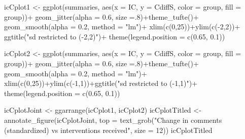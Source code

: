 \documentclass[
  10pt,
  dvipsnames,enabledeprecatedfontcommands]{scrartcl}
\newenvironment{Shaded}{\begin{snugshade}}{\end{snugshade}}
\newcommand{\AttributeTok}[1]{\textcolor[rgb]{0.77,0.63,0.00}{#1}}
\newcommand{\DecValTok}[1]{\textcolor[rgb]{0.00,0.00,0.81}{#1}}
\newcommand{\FloatTok}[1]{\textcolor[rgb]{0.00,0.00,0.81}{#1}}
\newcommand{\FunctionTok}[1]{\textcolor[rgb]{0.00,0.00,0.00}{#1}}
\newcommand{\NormalTok}[1]{#1}
\newcommand{\OtherTok}[1]{\textcolor[rgb]{0.56,0.35,0.01}{#1}}
\newcommand{\SpecialCharTok}[1]{\textcolor[rgb]{0.00,0.00,0.00}{#1}}
\newcommand{\StringTok}[1]{\textcolor[rgb]{0.31,0.60,0.02}{#1}}
\begin{document}
\begin{Shaded}
\begin{Highlighting}[]
\NormalTok{icCplot1 }\OtherTok{\textless{}{-}} \FunctionTok{ggplot}\NormalTok{(summaries, }\FunctionTok{aes}\NormalTok{(}\AttributeTok{x =}\NormalTok{ IC, }\AttributeTok{y =}\NormalTok{ CdiffS, }\AttributeTok{color =}\NormalTok{ group, }\AttributeTok{fill =}\NormalTok{ group))}\SpecialCharTok{+}
  \FunctionTok{geom\_jitter}\NormalTok{(}\AttributeTok{alpha =} \FloatTok{0.6}\NormalTok{, }\AttributeTok{size =}\NormalTok{.}\DecValTok{8}\NormalTok{)}\SpecialCharTok{+}\FunctionTok{theme\_tufte}\NormalTok{()}\SpecialCharTok{+}
  \FunctionTok{geom\_smooth}\NormalTok{(}\AttributeTok{alpha =} \FloatTok{0.2}\NormalTok{, }\AttributeTok{method =} \StringTok{"lm"}\NormalTok{)}\SpecialCharTok{+}
  \FunctionTok{xlim}\NormalTok{(}\FunctionTok{c}\NormalTok{(}\DecValTok{0}\NormalTok{,}\DecValTok{25}\NormalTok{))}\SpecialCharTok{+}\FunctionTok{ylim}\NormalTok{(}\FunctionTok{c}\NormalTok{(}\SpecialCharTok{{-}}\DecValTok{2}\NormalTok{,}\DecValTok{2}\NormalTok{))}\SpecialCharTok{+}
  \FunctionTok{ggtitle}\NormalTok{(}\StringTok{"sd restricted to ({-}2,2)"}\NormalTok{)}\SpecialCharTok{+}
  \FunctionTok{theme}\NormalTok{(}\AttributeTok{legend.position =} \FunctionTok{c}\NormalTok{(}\FloatTok{0.65}\NormalTok{, }\FloatTok{0.1}\NormalTok{))}

\NormalTok{icCplot2 }\OtherTok{\textless{}{-}}  \FunctionTok{ggplot}\NormalTok{(summaries, }\FunctionTok{aes}\NormalTok{(}\AttributeTok{x =}\NormalTok{ IC, }\AttributeTok{y =}\NormalTok{ CdiffS, }\AttributeTok{color =}\NormalTok{ group, }\AttributeTok{fill =}\NormalTok{ group))}\SpecialCharTok{+}
  \FunctionTok{geom\_jitter}\NormalTok{(}\AttributeTok{alpha =} \FloatTok{0.6}\NormalTok{, }\AttributeTok{size =}\NormalTok{.}\DecValTok{8}\NormalTok{)}\SpecialCharTok{+}\FunctionTok{theme\_tufte}\NormalTok{()}\SpecialCharTok{+}
  \FunctionTok{geom\_smooth}\NormalTok{(}\AttributeTok{alpha =} \FloatTok{0.2}\NormalTok{, }\AttributeTok{method =} \StringTok{"lm"}\NormalTok{)}\SpecialCharTok{+}
  \FunctionTok{xlim}\NormalTok{(}\FunctionTok{c}\NormalTok{(}\DecValTok{0}\NormalTok{,}\DecValTok{25}\NormalTok{))}\SpecialCharTok{+}\FunctionTok{ylim}\NormalTok{(}\FunctionTok{c}\NormalTok{(}\SpecialCharTok{{-}}\DecValTok{1}\NormalTok{,}\DecValTok{1}\NormalTok{))}\SpecialCharTok{+}\FunctionTok{ggtitle}\NormalTok{(}\StringTok{"sd restricted to ({-}1,1)"}\NormalTok{)}\SpecialCharTok{+}
  \FunctionTok{theme}\NormalTok{(}\AttributeTok{legend.position =} \FunctionTok{c}\NormalTok{(}\FloatTok{0.65}\NormalTok{, }\FloatTok{0.1}\NormalTok{))}

\NormalTok{icCplotJoint }\OtherTok{\textless{}{-}} \FunctionTok{ggarrange}\NormalTok{(icCplot1, icCplot2) }
\NormalTok{icCplotTitled }\OtherTok{\textless{}{-}} \FunctionTok{annotate\_figure}\NormalTok{(icCplotJoint, }
  \AttributeTok{top =} \FunctionTok{text\_grob}\NormalTok{(}\StringTok{"Change in comments (standardized) vs interventions received"}\NormalTok{,}
   \AttributeTok{size =} \DecValTok{12}\NormalTok{))}
\NormalTok{icCplotTitled}
\end{Highlighting}
\end{Shaded}
\end{document}
